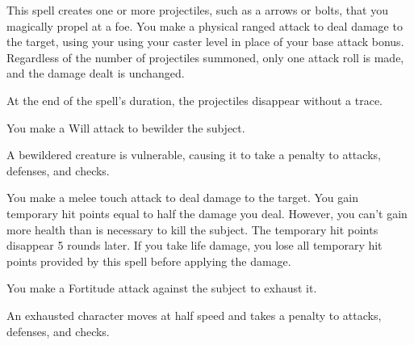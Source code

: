 \spellrng{\rngmed}
\begin{spelleffect}
This spell creates one or more projectiles, such as a arrows or bolts, that you magically propel at a foe. You make a physical ranged attack to deal damage to the target, using your using your caster level in place of your base attack bonus. Regardless of the number of projectiles summoned, only one attack roll is made, and the damage dealt is unchanged.
\end{spelleffect}
\begin{spellnotes}
At the end of the spell's duration, the projectiles disappear without a trace.
\end{spellnotes}

\spellrng{\rngclose}
\spelldur{\durshort}
\begin{spellhealthy}
    You make a Will attack to bewilder the subject.
\end{spellhealthy}
\begin{spellnotes}
A bewildered creature is vulnerable, causing it to take a  penalty to attacks, defenses, and checks.
\end{spellnotes}

\begin{spelleffect}
    You make a melee touch attack to deal damage to the target. You gain temporary hit points equal to half the damage you deal. However, you can't gain more health than is necessary to kill the subject. The temporary hit points disappear 5 rounds later. If you take life damage, you lose all temporary hit points provided by this spell before applying the damage.
\end{spelleffect}

\spellrng{\rngmed}
\begin{spelleffect}
    You make a Fortitude attack against the subject to exhaust it.
\end{spelleffect}
\begin{spellnotes}
     An exhausted character moves at half speed and takes a  penalty to attacks, defenses, and checks.
\end{spellnotes}

